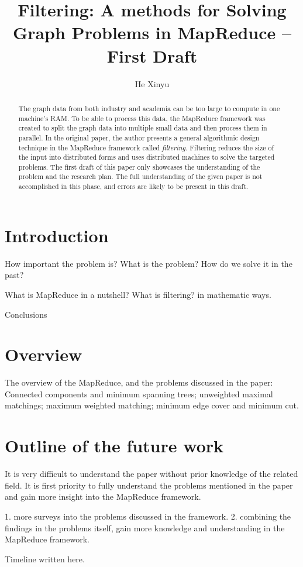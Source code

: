 \documentclass[a4paper,11pt]{article}
\title{Filtering: A methods for Solving Graph Problems in MapReduce -- First Draft}
\author{He Xinyu}
\begin{document}
\maketitle


\begin{abstract}
  The graph data from both industry and academia can be too large to compute in one machine's RAM. To be able to process this data, the MapReduce framework was created to split the graph data into multiple small data and then process them in parallel. In the original paper, the author presents a general algorithmic design technique in the MapReduce framework called \textit{filtering}. Filtering reduces the size of the input into distributed forms and uses distributed machines to solve the targeted problems. The first draft of this paper only showcases the understanding of the problem and the research plan. The full understanding of the given paper is not accomplished in this phase, and errors are likely to be present in this draft.
\end{abstract}


\section{Introduction}

How important the problem is? What is the problem? How do we solve it in the past?

What is MapReduce in a nutshell? What is filtering? in mathematic ways.

Conclusions \cite{Filtering2011}


\section{Overview}

The overview of the MapReduce, and the problems discussed in the paper: Connected components and minimum spanning trees; unweighted maximal matchings; maximum weighted matching; minimum edge cover and minimum cut.

\section{Outline of the future work}

It is very difficult to understand the paper without prior knowledge of the related field. It is first priority to fully understand the problems mentioned in the paper and gain more insight into the MapReduce framework. 

1. more surveys into the problems discussed in the framework. 
2. combining the findings in the problems itself, gain more knowledge and understanding in the MapReduce framework. 

Timeline written here.


\pagebreak %

 
\end{document}
